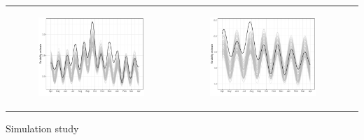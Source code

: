 \documentclass[11pt]{article}
\begin{document}
\begin{suppfigure}[ht]
\begin{tabular}{lll}
\begin{subfigure}[t]{0.30\linewidth}
		\includegraphics[width=1\linewidth]{figs/supp-figure-9e.pdf}
	\end{subfigure}&
	\begin{subfigure}[t]{0.30\linewidth}
		\centering
		\includegraphics[width=1\linewidth]{figs/supp-figure-9f.pdf}
	\end{subfigure}\\	
    \end{tabular}
    \caption{Simulation study}
    \label{fig:simulation}
\end{suppfigure}
\end{document}
